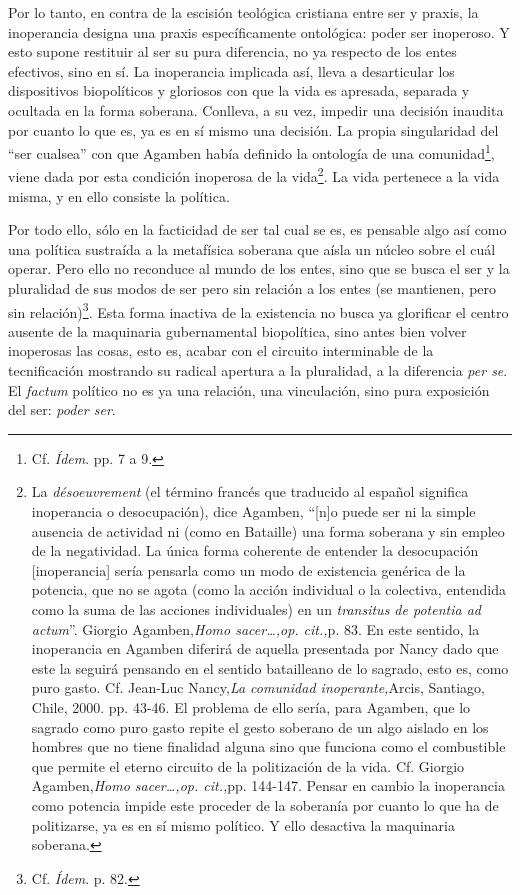 Por lo tanto, en contra de la escisión teológica cristiana entre ser y praxis, la inoperancia designa una praxis específicamente ontológica: poder ser inoperoso. Y esto supone restituir al ser su pura diferencia, no ya respecto de los entes efectivos, sino en sí. La inoperancia implicada así, lleva a desarticular los dispositivos biopolíticos y gloriosos con que la vida es apresada, separada y ocultada en la forma soberana. Conlleva, a su vez, impedir una decisión inaudita por cuanto lo que es, ya es en sí mismo una decisión. La propia singularidad del \enquote{ser cualsea} con que Agamben había definido la ontología de una comunidad\footnote{Cf. \emph{Ídem}. pp. 7 a 9.}, viene dada por esta condición inoperosa de la vida\footnote{La \emph{désoeuvrement} (el término francés que traducido al español significa inoperancia o desocupación), dice Agamben, \enquote{{[}n{]}o puede ser ni la simple ausencia de actividad ni (como en Bataille) una forma soberana y sin empleo de la negatividad. La única forma coherente de entender la desocupación {[}inoperancia{]} sería pensarla como un modo de existencia genérica de la potencia, que no se agota (como la acción individual o la colectiva, entendida como la suma de las acciones individuales) en un \emph{transitus de potentia ad actum}}. Giorgio Agamben,\emph{Homo sacer\ldots,op. cit.,}p. 83. En este sentido, la inoperancia en Agamben diferirá de aquella presentada por Nancy dado que este la seguirá pensando en el sentido batailleano de lo sagrado, esto es, como puro gasto. Cf. Jean-Luc Nancy,\emph{La comunidad inoperante,}Arcis, Santiago, Chile, 2000. pp. 43-46. El problema de ello sería, para Agamben, que lo sagrado como puro gasto repite el gesto soberano de un algo aislado en los hombres que no tiene finalidad alguna sino que funciona como el combustible que permite el eterno circuito de la politización de la vida. Cf. Giorgio Agamben,\emph{Homo sacer\ldots,op. cit.,}pp. 144-147. Pensar en cambio la inoperancia como potencia impide este proceder de la soberanía por cuanto lo que ha de politizarse, ya es en sí mismo político. Y ello desactiva la maquinaria soberana.}. La vida pertenece a la vida misma, y en ello consiste la política.

Por todo ello, sólo en la facticidad de ser tal cual se es, es pensable algo así como una política sustraída a la metafísica soberana que aísla un núcleo sobre el cuál operar. Pero ello no reconduce al mundo de los entes, sino que se busca el ser y la pluralidad de sus modos de ser pero sin relación a los entes (se mantienen, pero sin relación)\footnote{Cf. \emph{Ídem}. p. 82.}. Esta forma inactiva de la existencia  no busca ya glorificar el centro ausente de la maquinaria gubernamental biopolítica, sino antes bien volver inoperosas las cosas, esto es, acabar con el circuito interminable de la tecnificación mostrando su radical apertura a la pluralidad, a la diferencia \emph{per se}. El \emph{factum} político no es ya una relación, una vinculación, sino pura exposición del ser: \emph{poder ser}.

